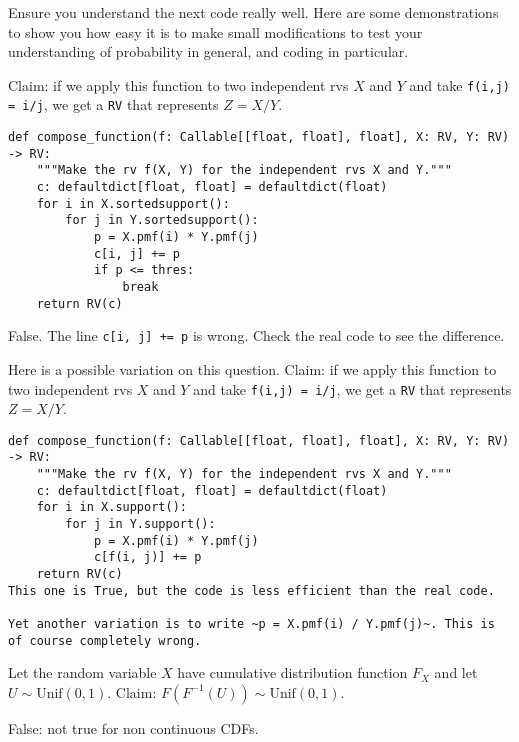 \documentclass[stochastic-or]{subfiles}
\begin{document}
Ensure you understand the next code really well.
Here are some demonstrations to show you how easy it is to make small modifications to test your understanding of probability in general, and coding in particular.

\begin{truefalse}
Claim: if we apply this function to two independent rvs \(X\) and \(Y\) and take \texttt{f(i,j) = i/j}, we get a \texttt{RV} that represents \(Z=X/Y\).
\begin{verbatim}
def compose_function(f: Callable[[float, float], float], X: RV, Y: RV) -> RV:
    """Make the rv f(X, Y) for the independent rvs X and Y."""
    c: defaultdict[float, float] = defaultdict(float)
    for i in X.sortedsupport():
        for j in Y.sortedsupport():
            p = X.pmf(i) * Y.pmf(j)
            c[i, j] += p
            if p <= thres:
                break
    return RV(c)
\end{verbatim}
\begin{solution}
False. The line \texttt{c[i, j] += p} is wrong. Check the real code to see the difference.

Here is a possible variation on this question.
Claim: if we apply this function to two independent rvs \(X\) and \(Y\) and take \texttt{f(i,j) = i/j}, we get a \texttt{RV} that represents \(Z=X/Y\).
\begin{verbatim}
def compose_function(f: Callable[[float, float], float], X: RV, Y: RV) -> RV:
    """Make the rv f(X, Y) for the independent rvs X and Y."""
    c: defaultdict[float, float] = defaultdict(float)
    for i in X.support():
        for j in Y.support():
            p = X.pmf(i) * Y.pmf(j)
            c[f(i, j)] += p
    return RV(c)
This one is True, but the code is less efficient than the real code.

Yet another variation is to write ~p = X.pmf(i) / Y.pmf(j)~. This is of course completely wrong.
\end{verbatim}
\end{solution}
\end{truefalse}

\begin{truefalse}
Let the random variable \(X\) have cumulative distribution function \(F_X\) and let \(U\sim\text{Unif}(0,1)\). Claim: \(F(F^{-1}(U))\sim\text{Unif}(0,1)\).
\begin{solution}
False:  not true for non continuous CDFs.
\end{solution}
\end{truefalse}
\end{document}
